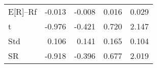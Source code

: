 \begin{tabular}{lrrrr}
\toprule
\midrule
E[R]--Rf & -0.013 & -0.008 & 0.016 & 0.029 \\
t & -0.976 & -0.421 & 0.720 & 2.147 \\
Std & 0.106 & 0.141 & 0.165 & 0.104 \\
SR & -0.918 & -0.396 & 0.677 & 2.019 \\
\bottomrule
\end{tabular}
